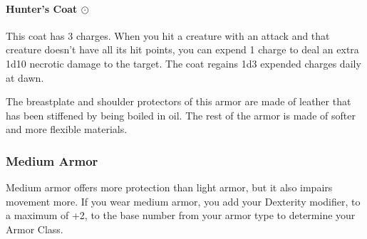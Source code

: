     \paragraph{Hunter's Coat $\odot$}
        This coat has 3 charges.
        When you hit a creature with an attack and that creature doesn't have all its hit points, you can expend 1 charge to deal an extra 1d10 necrotic damage to the target.
        The coat regains 1d3 expended charges daily at dawn.

        The breastplate and shoulder protectors of this armor are made of leather that has been stiffened by being boiled in oil.
        The rest of the armor is made of softer and more flexible materials.
\newpage
\subsubsection{Medium Armor} \label{ssec::mediumarmor}
    Medium armor offers more protection than light armor, but it also impairs movement more.
    If you wear medium armor, you add your Dexterity modifier, to a maximum of +2, to the base number from your armor type to determine your Armor Class.

